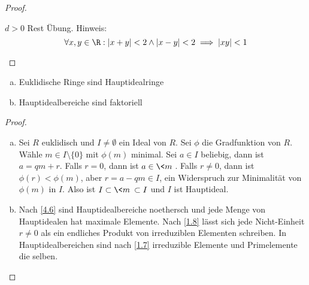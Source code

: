 \begin{st}
\begin{proof}
\begin{segnb}{$d > 0$}
			Rest Übung.
			Hinweis:
			\[
				\forall x,y \in \R:  |x+y| < 2 \land |x-y| < 2 \implies |xy| < 1
			\]
		\end{segnb}
	\end{proof}
\end{st}

\begin{st} \label{4.10}
	\begin{enumerate}[a)]
		\item
			Euklidische Ringe sind Hauptidealringe
		\item
			Hauptidealbereiche sind faktoriell
	\end{enumerate}
	\begin{proof}
		\begin{enumerate}[a)]
			\item
				Sei $R$ euklidisch und $I \neq \emptyset$ ein Ideal von $R$.
				Sei $\phi$ die Gradfunktion von $R$.
				Wähle $m \in I \setminus \{0\}$ mit $\phi(m)$ minimal.
				Sei $a \in I$ beliebig, dann ist $a = qm + r$.
				Falls $r = 0$, dann ist $a \in \<m\>$.
				Falls $r \neq 0$, dann ist $\phi(r) < \phi(m)$, aber $r = a - qm \in I$, ein Widerspruch zur Minimalität von $\phi(m)$ in $I$.
				Also ist $I \subset \<m\> \subset I$ und $I$ ist Hauptideal.
			\item
				Nach \ref{4.6} sind Hauptidealbereiche noethersch und jede Menge von Hauptidealen hat maximale Elemente.
				Nach \ref{1.8} lässt sich jede Nicht-Einheit $r \neq 0$ als ein endliches Produkt von irreduziblen Elementen schreiben.
				In Hauptidealbereichen sind nach \ref{1.7} irreduzible Elemente und Primelemente die selben.
		\end{enumerate}
	\end{proof}
\end{st}

